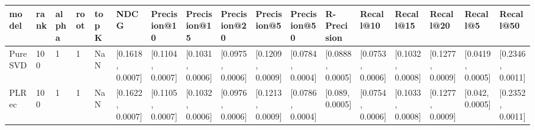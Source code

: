 \begin{tabular}{lllllllllllllllll}
\toprule
   model & rank & alpha & root & topK &              NDCG &      Precision@10 &      Precision@15 &      Precision@20 &       Precision@5 &      Precision@50 &       R-Precision &         Recall@10 &         Recall@15 &         Recall@20 &          Recall@5 &         Recall@50 \\
\midrule
 PureSVD &  100 &     1 &    1 &  NaN &  [0.1618, 0.0007] &  [0.1104, 0.0007] &  [0.1031, 0.0006] &  [0.0975, 0.0006] &  [0.1209, 0.0009] &  [0.0784, 0.0004] &  [0.0888, 0.0005] &  [0.0753, 0.0006] &  [0.1032, 0.0008] &  [0.1277, 0.0009] &  [0.0419, 0.0005] &  [0.2346, 0.0011] \\
   PLRec &  100 &     1 &    1 &  NaN &  [0.1622, 0.0007] &  [0.1105, 0.0007] &  [0.1032, 0.0006] &  [0.0976, 0.0006] &  [0.1213, 0.0009] &  [0.0786, 0.0004] &   [0.089, 0.0005] &  [0.0754, 0.0006] &  [0.1033, 0.0008] &  [0.1277, 0.0009] &   [0.042, 0.0005] &  [0.2352, 0.0011] \\
\bottomrule
\end{tabular}
